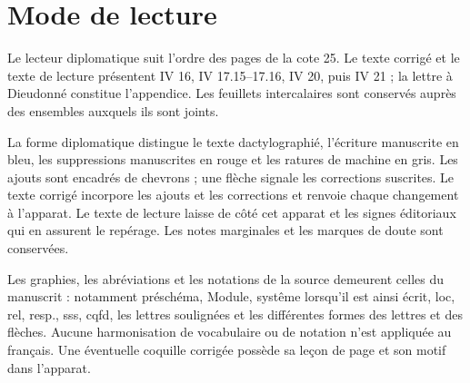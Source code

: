 \documentclass[10pt,a4paper]{article}
\begin{document}
\clearpage\section*{Mode de lecture}
Le lecteur diplomatique suit l'ordre des pages de la cote 25. Le texte corrigé et le texte de lecture présentent IV 16, IV 17.15--17.16, IV 20, puis IV 21 ; la lettre à Dieudonné constitue l'appendice. Les feuillets intercalaires sont conservés auprès des ensembles auxquels ils sont joints.

La forme diplomatique distingue le texte dactylographié, l'écriture manuscrite en bleu, les suppressions manuscrites en rouge et les ratures de machine en gris. Les ajouts sont encadrés de chevrons ; une flèche signale les corrections suscrites. Le texte corrigé incorpore les ajouts et les corrections et renvoie chaque changement à l'apparat. Le texte de lecture laisse de côté cet apparat et les signes éditoriaux qui en assurent le repérage. Les notes marginales et les marques de doute sont conservées.

Les graphies, les abréviations et les notations de la source demeurent celles du manuscrit : notamment préschéma, Module, systême lorsqu'il est ainsi écrit, loc, rel, resp., sss, cqfd, les lettres soulignées et les différentes formes des lettres et des flèches. Aucune harmonisation de vocabulaire ou de notation n'est appliquée au français. Une éventuelle coquille corrigée possède sa leçon de page et son motif dans l'apparat.
\end{document}
